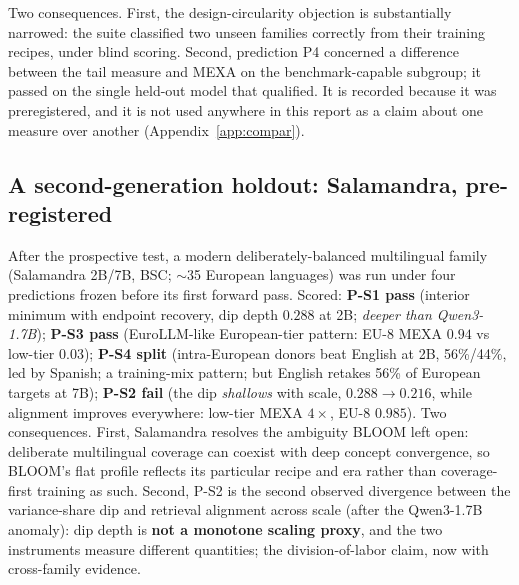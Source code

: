 \documentclass[11pt,a4paper]{article}
\begin{document}
Two consequences. First, the design-circularity objection is substantially
narrowed: the
suite classified two unseen families correctly from their training recipes,
under blind scoring. Second, prediction P4 concerned a difference between the tail measure and MEXA on the benchmark-capable subgroup; it passed on the single held-out model that qualified. It is recorded because it was preregistered, and it is not used anywhere in this report as a claim about one measure over another (Appendix~\ref{app:compar}).

\subsection*{A second-generation holdout: Salamandra, pre-registered}
After the prospective test, a modern deliberately-balanced multilingual family
(Salamandra 2B/7B, BSC; $\sim$35 European languages) was run under four
predictions frozen before its first forward pass. Scored: \textbf{P-S1
pass} (interior minimum with endpoint recovery, dip depth $0.288$ at 2B; \emph{deeper than
Qwen3-1.7B}); \textbf{P-S3 pass} (EuroLLM-like European-tier pattern:
EU-8 MEXA $0.94$ vs low-tier $0.03$); \textbf{P-S4 split} (intra-European
donors beat English at 2B, 56\%/44\%, led by Spanish; a training-mix
pattern; but English retakes 56\% of European targets at 7B);
\textbf{P-S2 fail} (the dip \emph{shallows} with scale, $0.288 \to 0.216$,
while alignment improves everywhere: low-tier MEXA $4\times$, EU-8
$0.985$). Two consequences. First, Salamandra resolves the ambiguity BLOOM
left open: deliberate multilingual coverage can coexist with deep concept
convergence, so BLOOM's flat profile reflects its particular recipe and
era rather than coverage-first training as such. Second,
P-S2 is the second observed divergence between the variance-share dip and
retrieval alignment across scale (after the Qwen3-1.7B anomaly): dip depth
is \textbf{not a monotone scaling proxy}, and the two instruments
measure different quantities; the division-of-labor claim, now with
cross-family evidence.
\end{document}
